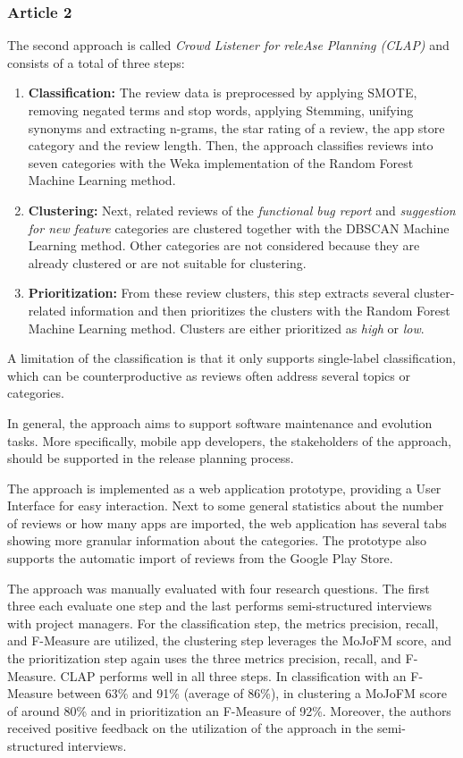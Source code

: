 \subsubsection{Article 2}

The second approach is called \textit{Crowd Listener for releAse Planning (CLAP)} and consists of a total of three steps: 

\begin{enumerate}
    \item \textbf{Classification:} The review data is preprocessed by applying SMOTE, removing negated terms and stop words, applying Stemming, unifying synonyms and extracting n-grams, the star rating of a review, the app store category and the review length. Then, the approach classifies reviews into seven categories with the Weka implementation of the Random Forest Machine Learning method. 
    \item \textbf{Clustering:} Next, related reviews of the \textit{functional bug report} and \textit{suggestion for new feature} categories are clustered together with the DBSCAN Machine Learning method. Other categories are not considered because they are already clustered or are not suitable for clustering. 
    \item \textbf{Prioritization:} From these review clusters, this step extracts several cluster-related information and then prioritizes the clusters with the Random Forest Machine Learning method. Clusters are either prioritized as \textit{high} or \textit{low}. 
\end{enumerate}

A limitation of the classification is that it only supports single-label classification, which can be counterproductive as reviews often address several topics or categories.

In general, the approach aims to support software maintenance and evolution tasks. More specifically, mobile app developers, the stakeholders of the approach, should be supported in the release planning process. 

The approach is implemented as a web application prototype, providing a User Interface for easy interaction. Next to some general statistics about the number of reviews or how many apps are imported, the web application has several tabs showing more granular information about the categories. The prototype also supports the automatic import of reviews from the Google Play Store.

The approach was manually evaluated with four research questions. The first three each evaluate one step and the last performs semi-structured interviews with project managers. For the classification step, the metrics precision, recall, and F-Measure are utilized, the clustering step leverages the MoJoFM score, and the prioritization step again uses the three metrics precision, recall, and F-Measure. CLAP performs well in all three steps. In classification with an F-Measure between 63\% and 91\% (average of 86\%), in clustering a MoJoFM score of around 80\% and in prioritization an F-Measure of 92\%. Moreover, the authors received positive feedback on the utilization of the approach in the semi-structured interviews.


